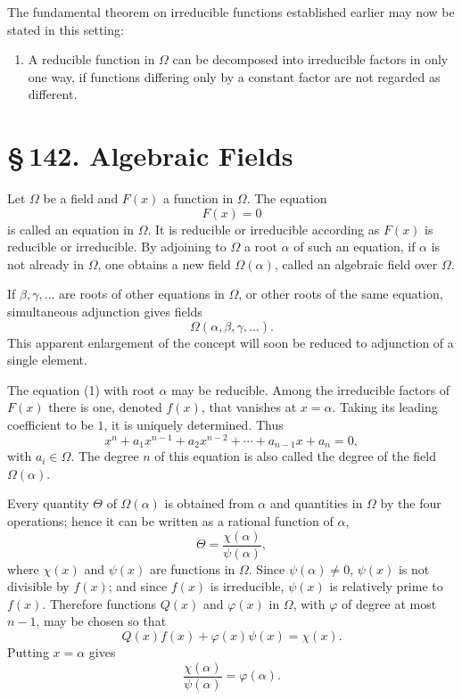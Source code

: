 \documentclass[11pt]{article}
\providecommand{\sect}[2]{\section*{\S\,#1. #2}}
\begin{document}
The fundamental theorem on irreducible functions established earlier may now be stated in this setting:

\begin{enumerate}[label=\Roman*.,leftmargin=2.8em,start=4]
\item A reducible function in $\Omega$ can be decomposed into irreducible factors in only one way, if functions differing only by a constant factor are not regarded as different.
\end{enumerate}

\sect{142}{Algebraic Fields}

Let $\Omega$ be a field and $F(x)$ a function in $\Omega$. The equation
\[
\tag{1}
        F(x)=0
\]
is called an equation in $\Omega$. It is reducible or irreducible according as $F(x)$ is reducible or irreducible. By adjoining to $\Omega$ a root $\alpha$ of such an equation, if $\alpha$ is not already in $\Omega$, one obtains a new field $\Omega(\alpha)$, called an algebraic field over $\Omega$.

If $\beta,\gamma,\ldots$ are roots of other equations in $\Omega$, or other roots of the same equation, simultaneous adjunction gives fields
\[
        \Omega(\alpha,\beta,\gamma,\ldots).
\]
This apparent enlargement of the concept will soon be reduced to adjunction of a single element.

The equation (1) with root $\alpha$ may be reducible. Among the irreducible factors of $F(x)$ there is one, denoted $f(x)$, that vanishes at $x=\alpha$. Taking its leading coefficient to be $1$, it is uniquely determined. Thus
\[
\tag{2}
        x^n+a_1x^{n-1}+a_2x^{n-2}+\cdots+a_{n-1}x+a_n=0,
\]
with $a_i\in\Omega$. The degree $n$ of this equation is also called the degree of the field $\Omega(\alpha)$.

Every quantity $\Theta$ of $\Omega(\alpha)$ is obtained from $\alpha$ and quantities in $\Omega$ by the four operations; hence it can be written as a rational function of $\alpha$,
\[
\tag{3}
        \Theta=\frac{\chi(\alpha)}{\psi(\alpha)},
\]
where $\chi(x)$ and $\psi(x)$ are functions in $\Omega$. Since $\psi(\alpha)\ne0$, $\psi(x)$ is not divisible by $f(x)$; and since $f(x)$ is irreducible, $\psi(x)$ is relatively prime to $f(x)$. Therefore functions $Q(x)$ and $\varphi(x)$ in $\Omega$, with $\varphi$ of degree at most $n-1$, may be chosen so that
\[
\tag{4}
        Q(x)f(x)+\varphi(x)\psi(x)=\chi(x).
\]
Putting $x=\alpha$ gives
\[
\tag{5}
        \frac{\chi(\alpha)}{\psi(\alpha)}=\varphi(\alpha).
\]
\end{document}

